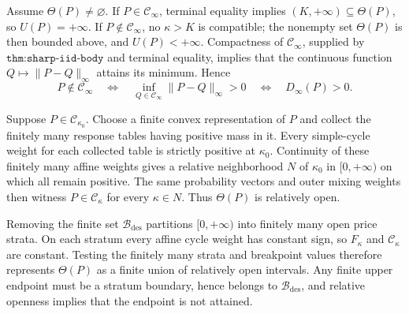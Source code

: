 Assume \(\Theta(P)\ne\varnothing\).  If \(P\in\mathcal C_\infty\), terminal equality implies \((K,+\infty)\subseteq\Theta(P)\), so \(U(P)=+\infty\).  If \(P\notin\mathcal C_\infty\), no \(\kappa>K\) is compatible; the nonempty set \(\Theta(P)\) is then bounded above, and \(U(P)<+\infty\).  Compactness of \(\mathcal C_\infty\), supplied by \(\texttt{thm:sharp-iid-body}\) and terminal equality, implies that the continuous function \(Q\mapsto\|P-Q\|_\infty\) attains its minimum.  Hence
\[
 P\notin\mathcal C_\infty
 \quad\Longleftrightarrow\quad
 \inf_{Q\in\mathcal C_\infty}\|P-Q\|_\infty>0
 \quad\Longleftrightarrow\quad
 D_\infty(P)>0.
\]

Suppose \(P\in\mathcal C_{\kappa_0}\).  Choose a finite convex representation of \(P\) and collect the finitely many response tables having positive mass in it.  Every simple-cycle weight for each collected table is strictly positive at \(\kappa_0\).  Continuity of these finitely many affine weights gives a relative neighborhood \(N\) of \(\kappa_0\) in \([0,+\infty)\) on which all remain positive.  The same probability vectors and outer mixing weights then witness \(P\in\mathcal C_\kappa\) for every \(\kappa\in N\).  Thus \(\Theta(P)\) is relatively open.

Removing the finite set \(\mathcal B_{\mathrm{des}}\) partitions \([0,+\infty)\) into finitely many open price strata.  On each stratum every affine cycle weight has constant sign, so \(F_\kappa\) and \(\mathcal C_\kappa\) are constant.  Testing the finitely many strata and breakpoint values therefore represents \(\Theta(P)\) as a finite union of relatively open intervals.  Any finite upper endpoint must be a stratum boundary, hence belongs to \(\mathcal B_{\mathrm{des}}\), and relative openness implies that the endpoint is not attained.

